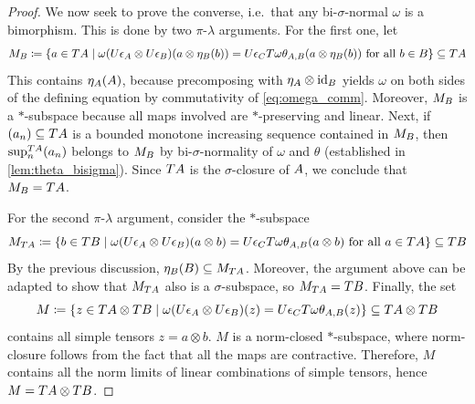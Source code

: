 \begin{proof}
	We now seek to prove the converse, i.e.\ that any bi-$\sigma$-normal ${\omega}$ is a bimorphism.
	This is done by two $\pi$-$\lambda$ arguments.
	For the first one, let
	\[
		M_{{B}} \coloneqq \lbrace a \in T{A} \mid \omega(U\epsilon_{{A}}\otimes U\epsilon_{{B}})(a \otimes \eta_{{B}}(b)) = U\epsilon_{{C}} T\omega \theta_{{A},{B}}(a \otimes \eta_{{B}}(b)) \text{ for all }b\in{B} \rbrace\subseteq T{A}
	\]
	This contains $\eta_{{A}}({A})$, because precomposing with $\eta_{{A}}\otimes \operatorname{id}_{{B}}$ yields $\omega$ on both sides of the defining equation by commutativity of \eqref{eq:omega_comm}.
	Moreover, $M_{{B}}$ is a $*$-subspace because all maps involved are $*$-preserving and linear.
	Next, if $(a_n)\subseteq T{A}$ is a bounded monotone increasing sequence contained in $M_{{B}}$, then $\sup_n^{T{A}} (a_n)$ belongs to $M_{{B}}$ by bi-$\sigma$-normality of $\omega$ and $\theta$ (established in \cref{lem:theta_bisigma}).
	Since $T{A}$ is the $\sigma$-closure of ${A}$, we conclude that $M_{{B}}=T{A}$.

	For the second $\pi$-$\lambda$ argument, consider the $*$-subspace
	\[
		M_{T{A}} \coloneqq \lbrace b \in T{B} \mid \omega(U\epsilon_{{A}}\otimes U\epsilon_{{B}})(a \otimes b) = U\epsilon_{{C}} T\omega\theta_{{A},{B}}(a \otimes b) \text{ for all }a\in T{A}\rbrace\subseteq T{B}
	\]
	By the previous discussion, $\eta_{{B}}({B})\subseteq M_{T{A}}$.
	Moreover, the argument above can be adapted to show that $M_{T{A}}$ also is a $\sigma$-subspace, so $M_{T{A}}=T{B}$.
	Finally, the set
	\[
		M\coloneqq \lbrace z \in T{A}\otimes T{B} \mid \omega(U\epsilon_{{A}}\otimes U\epsilon_{{B}})(z) = U\epsilon_{{C}} T\omega\theta_{{A},{B}}(z)\rbrace\subseteq T{A}\otimes T{B}
	\]
	contains all simple tensors $z=a\otimes b$.
	$M$ is a norm-closed $*$-subspace, where norm-closure follows from the fact that all the maps are contractive.
	Therefore, $M$ contains all the norm limits of linear combinations of simple tensors, hence $M=T{A}\otimes T{B}$.
\end{proof}



